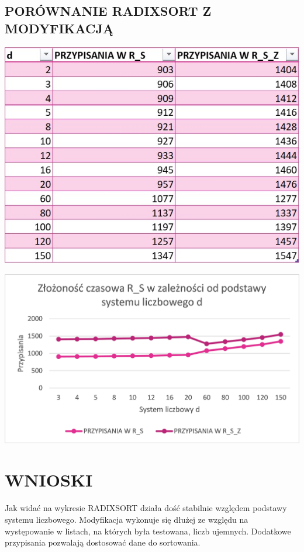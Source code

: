 \documentclass{article}
\begin{document}
	\subsection*{PORÓWNANIE RADIXSORT Z MODYFIKACJĄ}
	\begin{center}
		\includegraphics[scale = 0.5]{Obraz1.jpg}
	\end{center}
	\begin{center}
		\includegraphics[width = \textwidth]{Obraz2.jpg}
	\end{center} 
	\section*{WNIOSKI}
	Jak widać na wykresie RADIXSORT działa dość stabilnie względem podstawy systemu liczbowego. Modyfikacja wykonuje się dłużej ze względu na występowanie w listach, na których była testowana, liczb ujemnych. Dodatkowe przypisania pozwalają dostosować dane do sortowania.
\end{document}
